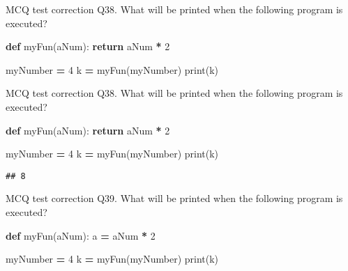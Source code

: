 \documentclass[
  8pt,
  ignorenonframetext,
]{beamer}
\newenvironment{Shaded}{\begin{snugshade}}{\end{snugshade}}
\newcommand{\BuiltInTok}[1]{#1}
\newcommand{\ControlFlowTok}[1]{\textcolor[rgb]{0.13,0.29,0.53}{\textbf{#1}}}
\newcommand{\DecValTok}[1]{\textcolor[rgb]{0.00,0.00,0.81}{#1}}
\newcommand{\KeywordTok}[1]{\textcolor[rgb]{0.13,0.29,0.53}{\textbf{#1}}}
\newcommand{\NormalTok}[1]{#1}
\newcommand{\OperatorTok}[1]{\textcolor[rgb]{0.81,0.36,0.00}{\textbf{#1}}}
\begin{document}
\begin{frame}[fragile]{MCQ test correction}
\protect\hypertarget{mcq-test-correction-74}{}
Q38. What will be printed when the following program is executed?

\begin{Shaded}
\begin{Highlighting}[]
\KeywordTok{def}\NormalTok{ myFun(aNum):}
    \ControlFlowTok{return}\NormalTok{ aNum }\OperatorTok{*} \DecValTok{2}

\NormalTok{myNumber }\OperatorTok{=} \DecValTok{4}
\NormalTok{k }\OperatorTok{=}\NormalTok{ myFun(myNumber)}
\BuiltInTok{print}\NormalTok{(k)}
\end{Highlighting}
\end{Shaded}
\end{frame}

\begin{frame}[fragile]{MCQ test correction}
\protect\hypertarget{mcq-test-correction-75}{}
Q38. What will be printed when the following program is executed?

\begin{Shaded}
\begin{Highlighting}[]
\KeywordTok{def}\NormalTok{ myFun(aNum):}
    \ControlFlowTok{return}\NormalTok{ aNum }\OperatorTok{*} \DecValTok{2}

\NormalTok{myNumber }\OperatorTok{=} \DecValTok{4}
\NormalTok{k }\OperatorTok{=}\NormalTok{ myFun(myNumber)}
\BuiltInTok{print}\NormalTok{(k)}
\end{Highlighting}
\end{Shaded}

\begin{verbatim}
## 8
\end{verbatim}
\end{frame}

\begin{frame}[fragile]{MCQ test correction}
\protect\hypertarget{mcq-test-correction-76}{}
Q39. What will be printed when the following program is executed?

\begin{Shaded}
\begin{Highlighting}[]
\KeywordTok{def}\NormalTok{ myFun(aNum):}
\NormalTok{    a }\OperatorTok{=}\NormalTok{ aNum }\OperatorTok{*} \DecValTok{2}

\NormalTok{myNumber }\OperatorTok{=} \DecValTok{4}
\NormalTok{k }\OperatorTok{=}\NormalTok{ myFun(myNumber)}
\BuiltInTok{print}\NormalTok{(k)}
\end{Highlighting}
\end{Shaded}
\end{frame}
\end{document}

